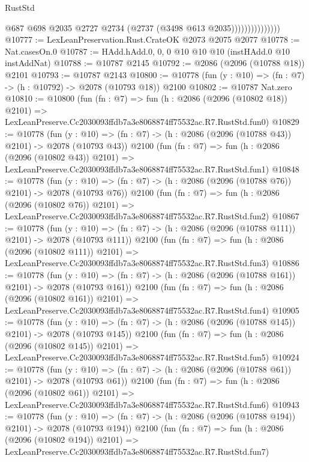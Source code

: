 \begin{lexlean}{RustStd}
\begin{coremodule}
                              @687
                              @698
                              @2035
                              @2727
                              @2734
                              (@2737 (@3498 @613 @2035)))))))))))))))
@10777 := LexLeanPreservation.Rust.CrateOK @2073 @2075 @2077
@10778 := Nat.casesOn.{0}
@10787 := HAdd.hAdd.{0, 0, 0} @10 @10 @10 (instHAdd.{0} @10 instAddNat)
@10788 := @10787 @2145
@10792 := @2086 (@2096 (@10788 @18)) @2101
@10793 := @10787 @2143
@10800 := @10778 (fun (y : @10) => (fn : @7) -> (h : @10792) -> @2078 (@10793 @18)) @2100
@10802 := @10787 Nat.zero
@10810 := @10800
    (fun (fn : @7) =>
    fun (h : @2086 (@2096 (@10802 @18)) @2101) =>
    LexLeanPreserve.Cc2030093ffdb7a3e8068874ff75532ac.R7.RustStd.fun0)
@10829 := @10778
    (fun (y : @10) => (fn : @7) -> (h : @2086 (@2096 (@10788 @43)) @2101) -> @2078 (@10793 @43))
    @2100
    (fun (fn : @7) =>
    fun (h : @2086 (@2096 (@10802 @43)) @2101) =>
    LexLeanPreserve.Cc2030093ffdb7a3e8068874ff75532ac.R7.RustStd.fun1)
@10848 := @10778
    (fun (y : @10) => (fn : @7) -> (h : @2086 (@2096 (@10788 @76)) @2101) -> @2078 (@10793 @76))
    @2100
    (fun (fn : @7) =>
    fun (h : @2086 (@2096 (@10802 @76)) @2101) =>
    LexLeanPreserve.Cc2030093ffdb7a3e8068874ff75532ac.R7.RustStd.fun2)
@10867 := @10778
    (fun (y : @10) => (fn : @7) -> (h : @2086 (@2096 (@10788 @111)) @2101) -> @2078 (@10793 @111))
    @2100
    (fun (fn : @7) =>
    fun (h : @2086 (@2096 (@10802 @111)) @2101) =>
    LexLeanPreserve.Cc2030093ffdb7a3e8068874ff75532ac.R7.RustStd.fun3)
@10886 := @10778
    (fun (y : @10) => (fn : @7) -> (h : @2086 (@2096 (@10788 @161)) @2101) -> @2078 (@10793 @161))
    @2100
    (fun (fn : @7) =>
    fun (h : @2086 (@2096 (@10802 @161)) @2101) =>
    LexLeanPreserve.Cc2030093ffdb7a3e8068874ff75532ac.R7.RustStd.fun4)
@10905 := @10778
    (fun (y : @10) => (fn : @7) -> (h : @2086 (@2096 (@10788 @145)) @2101) -> @2078 (@10793 @145))
    @2100
    (fun (fn : @7) =>
    fun (h : @2086 (@2096 (@10802 @145)) @2101) =>
    LexLeanPreserve.Cc2030093ffdb7a3e8068874ff75532ac.R7.RustStd.fun5)
@10924 := @10778
    (fun (y : @10) => (fn : @7) -> (h : @2086 (@2096 (@10788 @61)) @2101) -> @2078 (@10793 @61))
    @2100
    (fun (fn : @7) =>
    fun (h : @2086 (@2096 (@10802 @61)) @2101) =>
    LexLeanPreserve.Cc2030093ffdb7a3e8068874ff75532ac.R7.RustStd.fun6)
@10943 := @10778
    (fun (y : @10) => (fn : @7) -> (h : @2086 (@2096 (@10788 @194)) @2101) -> @2078 (@10793 @194))
    @2100
    (fun (fn : @7) =>
    fun (h : @2086 (@2096 (@10802 @194)) @2101) =>
    LexLeanPreserve.Cc2030093ffdb7a3e8068874ff75532ac.R7.RustStd.fun7)

\end{coremodule}
\end{lexlean}

